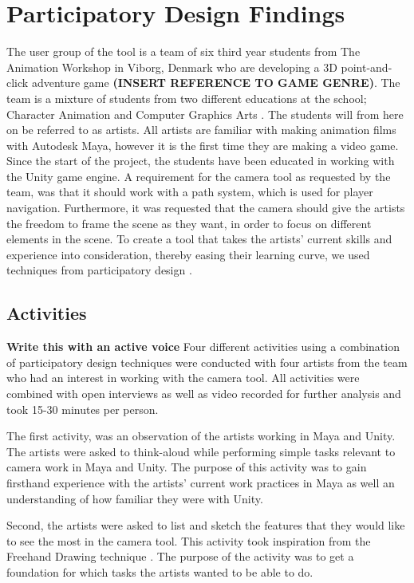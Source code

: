 \section{Participatory Design Findings}
The user group of the tool is a team of six third year students from The Animation Workshop in Viborg, Denmark who are developing a 3D point-and-click adventure game \textbf{(INSERT REFERENCE TO GAME GENRE)}.  The team is a mixture of students from two different educations at the school; Character Animation and Computer Graphics Arts \cite{taw_degrees}. The students will from here on be referred to as artists.
All artists are familiar with making animation films with Autodesk Maya, however it is the first time they are making a video game. Since the start of the project, the students have been educated in working with the Unity game engine.
A requirement for the camera tool as requested by the team, was that it should work with a path system, which is used for player navigation. Furthermore, it was requested that the camera should give the artists the freedom to frame the scene as they want, in order to focus on different elements in the scene.
To create a tool that takes the artists' current skills and experience into consideration, thereby easing their learning curve, we used techniques from participatory design \cite{part_design}.

\subsection{Activities}
\textbf{Write this with an active voice}
Four different activities using a combination of participatory design techniques were conducted with four artists from the team who had an interest in working with the camera tool. All activities were combined with open interviews as well as video recorded for further analysis and took 15-30 minutes per person.

The first activity, was an observation \cite{part_design} of the artists working in Maya and Unity. The artists were asked to think-aloud \cite{part_design} while performing simple tasks relevant to camera work in Maya and Unity. The purpose of this activity was to gain firsthand experience with the artists' current work practices in Maya as well an understanding of how familiar they were with Unity.

Second, the artists were asked to list and sketch the features that they would like to see the most in the camera tool. This activity took inspiration from the Freehand Drawing technique \cite{part_design}. The purpose of the activity was to get a foundation for which tasks the artists wanted to be able to do.

